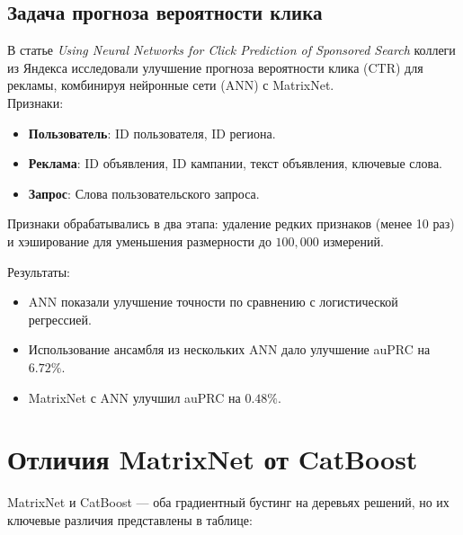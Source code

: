\subsection{Задача прогноза вероятности клика}
В статье \emph{Using Neural Networks for Click Prediction of Sponsored Search} коллеги из Яндекса исследовали улучшение прогноза вероятности клика (CTR) для рекламы, комбинируя нейронные сети (ANN) с MatrixNet.\\

Признаки:
\begin{itemize}
    \item \textbf{Пользователь}: ID пользователя, ID региона.
    \item \textbf{Реклама}: ID объявления, ID кампании, текст объявления, ключевые слова.
    \item \textbf{Запрос}: Слова пользовательского запроса.
\end{itemize}
Признаки обрабатывались в два этапа: удаление редких признаков (менее 10 раз) и хэширование для уменьшения размерности до $100{,}000$ измерений.

Результаты:
\begin{itemize}
    \item ANN показали улучшение точности по сравнению с логистической регрессией.
    \item Использование ансамбля из нескольких ANN дало улучшение auPRC на $6.72\%$.
    \item MatrixNet с ANN улучшил auPRC на $0.48\%$.
\end{itemize}

\section{Отличия MatrixNet от CatBoost}
MatrixNet и CatBoost — оба градиентный бустинг на деревьях решений, но их ключевые различия представлены в таблице:\\

